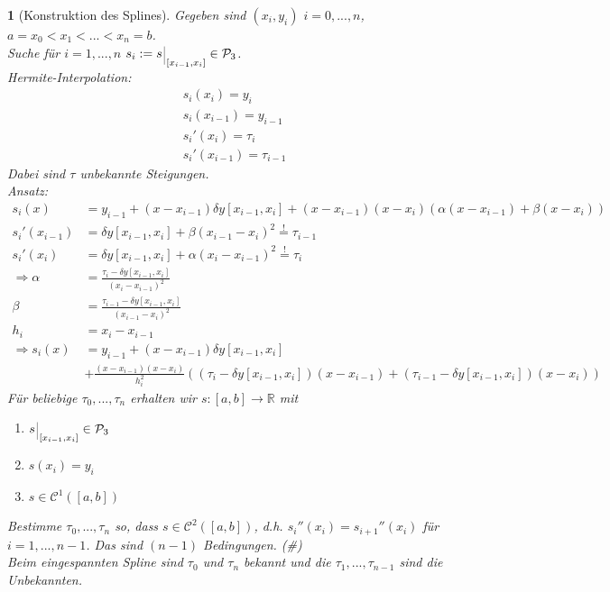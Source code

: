 \documentclass[12pt]{article}
\theoremstyle{break}
\newtheorem{nothing}[theorem]{}
\begin{document}
\begin{nothing}[Konstruktion des Splines]
Gegeben sind $(x_i, y_i)$ $i=0,...,n$, $a = x_0 < x_1 < ... < x_n = b$. \\
Suche für $i=1,...,n$ $s_i := s\,\rule[-2mm]{0.1mm}{5mm}_{\thinspace [x_{i-1}, x_i]}  \in \mathcal{P}_3$. \\
Hermite-Interpolation:
\begin{align*}
&s_i(x_i) = y_i &\\
&s_i(x_{i-1}) = y_{i-1} &\\
&s_i'(x_i) = \tau_i &\\
&s_i'(x_{i-1}) = \tau_{i-1}
\end{align*}
Dabei sind $\tau$ unbekannte Steigungen. \\
Ansatz: 
\begin{align*}
s_i(x) &= y_{i-1} + (x-x_{i-1}) \delta y[x_{i-1}, x_i] + (x-x_{i-1})(x-x_i) \left( \alpha (x-x_{i-1}) + \beta (x-x_i) \right) &\\
s_i'(x_{i-1}) &= \delta y[x_{i-1}, x_i] + \beta (x_{i-1} - x_i)^2 \overset{!}{=} \tau_{i-1} &\\
s_i'(x_i) &= \delta y[x_{i-1}, x_i] + \alpha (x_i - x_{i-1})^2 \overset{!}{=} \tau_i &\\
\Rightarrow \alpha &= \frac{\tau_i - \delta y[x_{i-1}, x_i]}{(x_i - x_{i-1})^2} &\\
\beta &= \frac{\tau_{i-1} - \delta y[x_{i-1}, x_i]}{(x_{i-1}- x_i)^2} &\\
h_i &= x_i-x_{i-1} &\\
\Rightarrow s_i(x) &= y_{i-1} + (x-x_{i-1}) \delta y [x_{i-1}, x_i] &\\ 
&+ \frac{(x-x_{i-1} )(x-x_i)}{h_i^2} \left( (\tau_i - \delta y[x_{i-1},x_i])(x-x_{i-1})+(\tau_{i-1} - \delta y[x_{i-1},x_i])(x-x_i) \right)
\end{align*}
Für beliebige $\tau_0,..., \tau_n$ erhalten wir $s\colon [a,b] \rightarrow \mathbb{R}$ mit 
\begin{enumerate}
  \item[i)] $s\,\rule[-2mm]{0.1mm}{5mm}_{\thinspace [x_{i-1}, x_i]} \in \mathcal{P}_3$
  \item[ii)] $s(x_i) = y_i$
  \item[iii)] $s \in \mathcal{C}^1([a,b])$
\end{enumerate} 
Bestimme $\tau_0,..., \tau_n$ so, dass $s \in \mathcal{C}^2([a,b])$, d.h. $s_i''(x_i) = s_{i+1}''(x_i)$ für $i=1,...,n-1$. Das sind $(n-1)$ Bedingungen. (\#) \\
Beim eingespannten Spline sind $\tau_0$ und $\tau_n$ bekannt und die $\tau_1, ..., \tau_{n-1}$ sind die Unbekannten. \\

\end{nothing}
\end{document}
